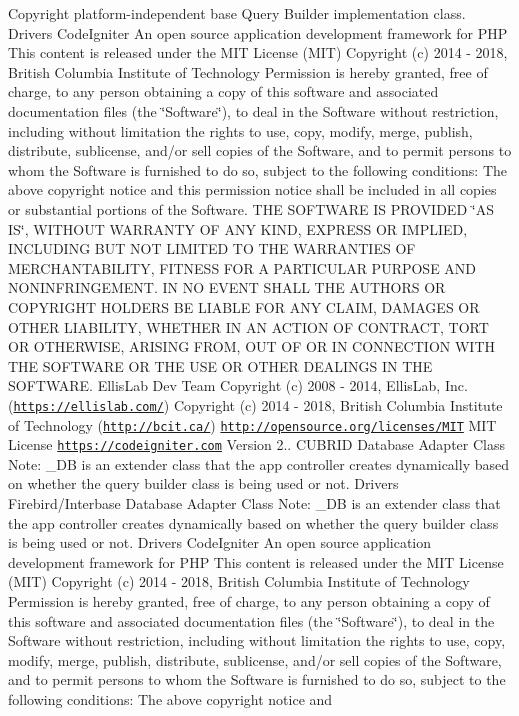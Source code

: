 \begin{DoxyCopyright}{Copyright}
platform-\/independent base Query Builder implementation class.  Drivers Code\+Igniter An open source application development framework for P\+HP This content is released under the M\+IT License (M\+IT) Copyright (c) 2014 -\/ 2018, British Columbia Institute of Technology Permission is hereby granted, free of charge, to any person obtaining a copy of this software and associated documentation files (the \char`\"{}\+Software\char`\"{}), to deal in the Software without restriction, including without limitation the rights to use, copy, modify, merge, publish, distribute, sublicense, and/or sell copies of the Software, and to permit persons to whom the Software is furnished to do so, subject to the following conditions\+: The above copyright notice and this permission notice shall be included in all copies or substantial portions of the Software. T\+HE S\+O\+F\+T\+W\+A\+RE IS P\+R\+O\+V\+I\+D\+ED \char`\"{}\+A\+S I\+S\char`\"{}, W\+I\+T\+H\+O\+UT W\+A\+R\+R\+A\+N\+TY OF A\+NY K\+I\+ND, E\+X\+P\+R\+E\+SS OR I\+M\+P\+L\+I\+ED, I\+N\+C\+L\+U\+D\+I\+NG B\+UT N\+OT L\+I\+M\+I\+T\+ED TO T\+HE W\+A\+R\+R\+A\+N\+T\+I\+ES OF M\+E\+R\+C\+H\+A\+N\+T\+A\+B\+I\+L\+I\+TY, F\+I\+T\+N\+E\+SS F\+OR A P\+A\+R\+T\+I\+C\+U\+L\+AR P\+U\+R\+P\+O\+SE A\+ND N\+O\+N\+I\+N\+F\+R\+I\+N\+G\+E\+M\+E\+NT. IN NO E\+V\+E\+NT S\+H\+A\+LL T\+HE A\+U\+T\+H\+O\+RS OR C\+O\+P\+Y\+R\+I\+G\+HT H\+O\+L\+D\+E\+RS BE L\+I\+A\+B\+LE F\+OR A\+NY C\+L\+A\+IM, D\+A\+M\+A\+G\+ES OR O\+T\+H\+ER L\+I\+A\+B\+I\+L\+I\+TY, W\+H\+E\+T\+H\+ER IN AN A\+C\+T\+I\+ON OF C\+O\+N\+T\+R\+A\+CT, T\+O\+RT OR O\+T\+H\+E\+R\+W\+I\+SE, A\+R\+I\+S\+I\+NG F\+R\+OM, O\+UT OF OR IN C\+O\+N\+N\+E\+C\+T\+I\+ON W\+I\+TH T\+HE S\+O\+F\+T\+W\+A\+RE OR T\+HE U\+SE OR O\+T\+H\+ER D\+E\+A\+L\+I\+N\+GS IN T\+HE S\+O\+F\+T\+W\+A\+RE.  Ellis\+Lab Dev Team  Copyright (c) 2008 -\/ 2014, Ellis\+Lab, Inc. (\href{https://ellislab.com/}{\tt https\+://ellislab.\+com/})  Copyright (c) 2014 -\/ 2018, British Columbia Institute of Technology (\href{http://bcit.ca/}{\tt http\+://bcit.\+ca/})  \href{http://opensource.org/licenses/MIT}{\tt http\+://opensource.\+org/licenses/\+M\+IT} M\+IT License  \href{https://codeigniter.com}{\tt https\+://codeigniter.\+com}  Version 2..  C\+U\+B\+R\+ID Database Adapter Class Note\+: \+\_\+\+DB is an extender class that the app controller creates dynamically based on whether the query builder class is being used or not.  Drivers Firebird/\+Interbase Database Adapter Class Note\+: \+\_\+\+DB is an extender class that the app controller creates dynamically based on whether the query builder class is being used or not.  Drivers Code\+Igniter An open source application development framework for P\+HP This content is released under the M\+IT License (M\+IT) Copyright (c) 2014 -\/ 2018, British Columbia Institute of Technology Permission is hereby granted, free of charge, to any person obtaining a copy of this software and associated documentation files (the \char`\"{}\+Software\char`\"{}), to deal in the Software without restriction, including without limitation the rights to use, copy, modify, merge, publish, distribute, sublicense, and/or sell copies of the Software, and to permit persons to whom the Software is furnished to do so, subject to the following conditions\+: The above copyright notice and 
\end{DoxyCopyright}
